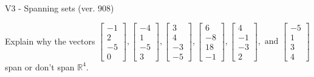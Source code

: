 \begin{exercise}
  \begin{exerciseTitle}V3 - Spanning sets (ver. 908)\end{exerciseTitle}
  \begin{exerciseStatement}
    Explain why the vectors \(\left[\begin{array}{r}
-1 \\
2 \\
-5 \\
0
\end{array}\right] , \left[\begin{array}{r}
-4 \\
1 \\
-5 \\
3
\end{array}\right] , \left[\begin{array}{r}
3 \\
4 \\
-3 \\
-5
\end{array}\right] , \left[\begin{array}{r}
6 \\
-8 \\
18 \\
-1
\end{array}\right] , \left[\begin{array}{r}
4 \\
-1 \\
-3 \\
2
\end{array}\right] , \text{ and } \left[\begin{array}{r}
-5 \\
1 \\
3 \\
4
\end{array}\right]\) span or don't span \(\mathbb{R}^4\). 
	



\end{exerciseStatement}
\end{exercise}
